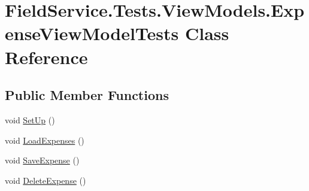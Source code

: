 \hypertarget{class_field_service_1_1_tests_1_1_view_models_1_1_expense_view_model_tests}{\section{Field\+Service.\+Tests.\+View\+Models.\+Expense\+View\+Model\+Tests Class Reference}
\label{class_field_service_1_1_tests_1_1_view_models_1_1_expense_view_model_tests}
}
\subsection*{Public Member Functions}
\begin{DoxyCompactItemize}
\item 
void \hyperlink{class_field_service_1_1_tests_1_1_view_models_1_1_expense_view_model_tests_ae9721745778a34c469f953f4a16fcc30}{Set\+Up} ()
\item 
void \hyperlink{class_field_service_1_1_tests_1_1_view_models_1_1_expense_view_model_tests_a89ff701fa6ea40d3570554d23f9a08cd}{Load\+Expenses} ()
\item 
void \hyperlink{class_field_service_1_1_tests_1_1_view_models_1_1_expense_view_model_tests_af3e565a89a07a1fd73057ed8aeaa33c2}{Save\+Expense} ()
\item 
void \hyperlink{class_field_service_1_1_tests_1_1_view_models_1_1_expense_view_model_tests_ac861f5363b3bd9133acf8fe5bc3a9654}{Delete\+Expense} ()
\end{DoxyCompactItemize}


